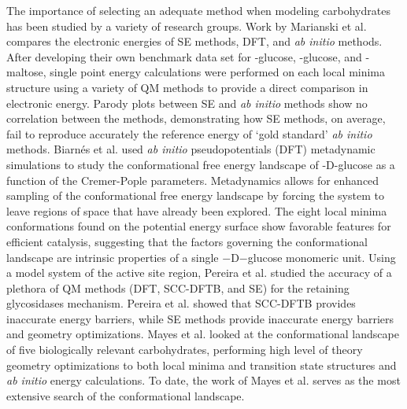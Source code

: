 \documentclass{article}
\begin{document}
\hfill \break

The importance of selecting an adequate method when modeling carbohydrates has been studied by a variety of research groups. 
Work by Marianski et al. compares the electronic energies of SE methods, DFT, and \textit{ab initio} methods. After developing their
own benchmark data set for \textbeta-glucose, \textalpha-glucose, and \textalpha-maltose, single point energy calculations were performed 
on each local minima structure using a variety of QM methods to provide a direct comparison in electronic energy.\cite{Marianski2016}
Parody plots between SE and \textit{ab initio} methods show no correlation between the methods, demonstrating how SE methods, on average,
fail to reproduce accurately the reference energy of `gold standard' \textit{ab initio} methods.\cite{Marianski2016} Biarn\'{e}s et al. used \textit{ab
initio} pseudopotentials (DFT) metadynamic simulations to study the conformational free energy landscape of \textbeta-D-glucose as a function 
of the Cremer-Pople parameters.\cite{Biarnes2007} Metadynamics allows for enhanced sampling of the conformational free energy 
landscape by forcing the system to leave regions of space that have already been explored.\cite{Laio2002,Laio2005} The eight local minima
conformations found on the potential energy surface show favorable features for efficient catalysis, suggesting that the factors governing the 
conformational landscape are intrinsic properties of a single \textbeta$-$D$-$glucose monomeric unit.\cite{Biarnes2007} Using a model system 
of the active site region, Pereira et al. studied the accuracy of a plethora of QM methods (DFT, SCC-DFTB, and SE) for the retaining glycosidases
mechanism.\cite{Pereira2017} Pereira et al. showed 	that SCC-DFTB provides inaccurate energy barriers, while SE methods provide 
inaccurate energy barriers and geometry optimizations.\cite{Pereira2017} Mayes et al. looked at the conformational landscape of five biologically 
relevant carbohydrates, performing high level of theory geometry optimizations to both local minima and transition state structures and \textit{ab
initio} energy calculations.\cite{Mayes2014} To date, the work of Mayes et al. serves as the most extensive search of the conformational landscape. 
\end{document}
